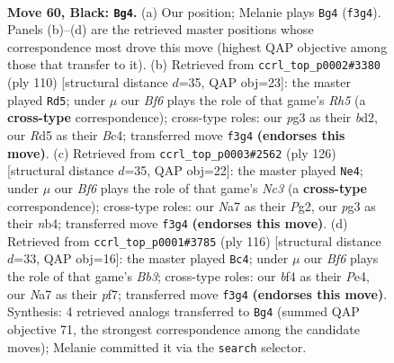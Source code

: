 \documentclass[11pt]{article}
\begin{document}
\clearpage

\begin{figure}[p]\centering
\begin{subfigure}{0.46\textwidth}\centering
\resizebox{\linewidth}{!}{%
\newchessgame
\chessboard[
  setfen={8/n1P2k1K/p7/P2r1p1p/4pB2/5bP1/8/RN6 b - - 27 60},
  showmover=false,
  pgfstyle=straightmove, color=movearrow, markmove={f3-g4}
]}
\caption{}
\end{subfigure}\hfill
\begin{subfigure}{0.46\textwidth}\centering
\resizebox{\linewidth}{!}{%
\newchessgame
\chessboard[
  setfen={8/4rpk1/8/p6R/P1Bp4/1P3KP1/3b4/8 w - - 3 56},
  showmover=false,
  pgfstyle=straightmove, color=movearrow, markmove={h5-d5}
]}
\caption{}
\end{subfigure}
\\[4pt]
\begin{subfigure}{0.46\textwidth}\centering
\resizebox{\linewidth}{!}{%
\newchessgame
\chessboard[
  setfen={6b1/1B6/3r2pk/P3R2p/1np4P/2N5/6PK/8 w - - 17 64},
  showmover=false,
  pgfstyle=straightmove, color=movearrow, markmove={c3-e4}
]}
\caption{}
\end{subfigure}\hfill
\begin{subfigure}{0.46\textwidth}\centering
\resizebox{\linewidth}{!}{%
\newchessgame
\chessboard[
  setfen={3b4/5pk1/8/1K2p1p1/3pP1P1/1B3P1R/P7/5r2 w - - 2 59},
  showmover=false,
  pgfstyle=straightmove, color=movearrow, markmove={b3-c4}
]}
\caption{}
\end{subfigure}
\caption{\textbf{Move 60, Black: \texttt{Bg4}.} (a) Our position; Melanie plays \texttt{Bg4} (\texttt{f3g4}). Panels (b)--(d) are the retrieved master positions whose correspondence most drove this move (highest QAP objective among those that transfer to it). (b) Retrieved from \texttt{ccrl\_top\_p0002\#3380} (ply 110) [structural distance $d$=35, QAP obj=23]: the master played \texttt{Rd5}; under $\mu$ our \emph{Bf6} plays the role of that game's \emph{Rh5} (a \textbf{cross-type} correspondence); cross-type roles: our \emph{p}g3 as their \emph{b}d2, our \emph{R}d5 as their \emph{B}c4; transferred move \texttt{f3g4} \textbf{(endorses this move)}. (c) Retrieved from \texttt{ccrl\_top\_p0003\#2562} (ply 126) [structural distance $d$=35, QAP obj=22]: the master played \texttt{Ne4}; under $\mu$ our \emph{Bf6} plays the role of that game's \emph{Nc3} (a \textbf{cross-type} correspondence); cross-type roles: our \emph{N}a7 as their \emph{P}g2, our \emph{p}g3 as their \emph{n}b4; transferred move \texttt{f3g4} \textbf{(endorses this move)}. (d) Retrieved from \texttt{ccrl\_top\_p0001\#3785} (ply 116) [structural distance $d$=33, QAP obj=16]: the master played \texttt{Bc4}; under $\mu$ our \emph{Bf6} plays the role of that game's \emph{Bb3}; cross-type roles: our \emph{b}f4 as their \emph{P}e4, our \emph{N}a7 as their \emph{p}f7; transferred move \texttt{f3g4} \textbf{(endorses this move)}. Synthesis: 4 retrieved analogs transferred to \texttt{Bg4} (summed QAP objective 71, the strongest correspondence among the candidate moves); Melanie committed it via the \texttt{search} selector.}
\label{fig:thought-m119}
\end{figure}
\end{document}
